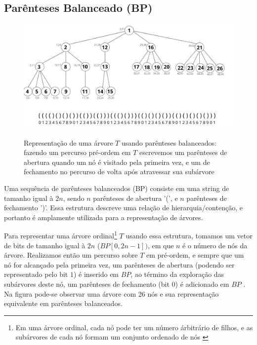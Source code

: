 \subsection{Parênteses Balanceado (BP)}\label{sec:sec-parenthesis-balanceados}
\begin{figure}[!ht]
\centering
  \caption[Representação de árvores com parênteses balanceados]{Representação de uma árvore $T$ usando parênteses balanceados: fazendo um percurso pré-ordem em $T$ escrevemos um parênteses de abertura quando um nó é visitado pela primeira vez, e um de fechamento no percurso de volta após atravessar  sua subárvore \citep{paper-succint-representation-of-balanced-parentheses}}
  \includegraphics[width=\columnwidth]{images/arvore_geral.png}
  \label{fig:parenthesis-representation}
\end{figure}
Uma sequência de parênteses balanceados (BP) consiste em uma string de tamanho igual à $2n$, sendo $n$ parênteses de abertura '(', e $n$ parênteses de fechamento ')'. Essa estrutura descreve uma relação de hierarquia/contenção, e portanto é amplamente utilizada para a representação de árvores.

Para representar uma árvore ordinal\footnote{Em uma árvore ordinal, cada nó pode ter um número árbitrário de filhos, e as subárvores de cada nó formam um conjunto ordenado de nós \citep{tenenbaum}} $T$ usando essa estrutura, tomamos um vetor de bits de tamanho igual à $2n$ ($BP[0,2n-1])$, em que $n$ é o número de nós da árvore. Realizamos então um percurso sobre $T$ em pré-ordem, e sempre que um nó for alcançado pela primeira vez, um parênteses de abertura (podendo ser representado pelo bit $1$) é inserido em $BP$, ao término da exploração das subárvores deste nó, um parênteses de fechamento (bit $0$) é adicionado em $BP$ \citep{paper-succint-trees-in-practice}.  Na figura  pode-se observar uma árvore com 26 nós e sua representação equivalente em parênteses balanceados.

